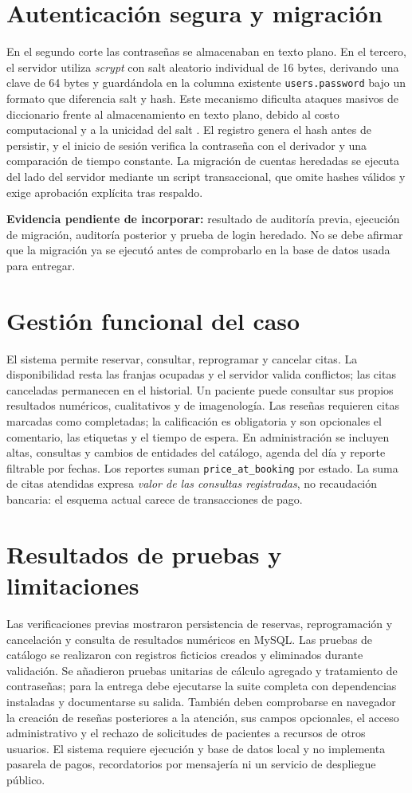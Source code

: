 \documentclass[conference]{IEEEtran}
\begin{document}
\section{Autenticación segura y migración}
En el segundo corte las contraseñas se almacenaban en texto plano. En el tercero, el servidor utiliza \emph{scrypt} con salt aleatorio individual de 16 bytes, derivando una clave de 64 bytes y guardándola en la columna existente \texttt{users.password} bajo un formato que diferencia salt y hash. Este mecanismo dificulta ataques masivos de diccionario frente al almacenamiento en texto plano, debido al costo computacional y a la unicidad del salt \cite{rfc7914,owasp}. El registro genera el hash antes de persistir, y el inicio de sesión verifica la contraseña con el derivador y una comparación de tiempo constante. La migración de cuentas heredadas se ejecuta del lado del servidor mediante un script transaccional, que omite hashes válidos y exige aprobación explícita tras respaldo.
\par\textbf{Evidencia pendiente de incorporar:} resultado de auditoría previa, ejecución de migración, auditoría posterior y prueba de login heredado. No se debe afirmar que la migración ya se ejecutó antes de comprobarlo en la base de datos usada para entregar.
\section{Gestión funcional del caso}
El sistema permite reservar, consultar, reprogramar y cancelar citas. La disponibilidad resta las franjas ocupadas y el servidor valida conflictos; las citas canceladas permanecen en el historial. Un paciente puede consultar sus propios resultados numéricos, cualitativos y de imagenología. Las reseñas requieren citas marcadas como completadas; la calificación es obligatoria y son opcionales el comentario, las etiquetas y el tiempo de espera. En administración se incluyen altas, consultas y cambios de entidades del catálogo, agenda del día y reporte filtrable por fechas. Los reportes suman \texttt{price\_at\_booking} por estado. La suma de citas atendidas expresa \emph{valor de las consultas registradas}, no recaudación bancaria: el esquema actual carece de transacciones de pago.
\section{Resultados de pruebas y limitaciones}
Las verificaciones previas mostraron persistencia de reservas, reprogramación y cancelación y consulta de resultados numéricos en MySQL. Las pruebas de catálogo se realizaron con registros ficticios creados y eliminados durante validación. Se añadieron pruebas unitarias de cálculo agregado y tratamiento de contraseñas; para la entrega debe ejecutarse la suite completa con dependencias instaladas y documentarse su salida. También deben comprobarse en navegador la creación de reseñas posteriores a la atención, sus campos opcionales, el acceso administrativo y el rechazo de solicitudes de pacientes a recursos de otros usuarios. El sistema requiere ejecución y base de datos local y no implementa pasarela de pagos, recordatorios por mensajería ni un servicio de despliegue público.
\end{document}
